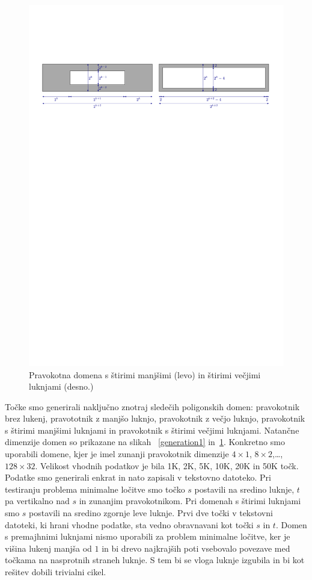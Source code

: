 \documentclass[a4paper, 12pt]{book}
\begin{document}
\begin{figure}
\centerline{\includegraphics[scale=0.75, page=2]{pics/data_generation.pdf}}
\caption{Pravokotna domena s štirimi manjšimi (levo) in štirimi večjimi luknjami (desno.)}
\label{generation2}
\end{figure}

Točke smo generirali naključno znotraj sledečih poligonskih domen: pravokotnik brez lukenj, pravototnik z manjšo luknjo, pravokotnik z večjo luknjo, pravokotnik s štirimi manjšimi luknjami in pravokotnik s štirimi večjimi luknjami. Natančne dimenzije domen so prikazane na slikah ~\ref{generation1} in~\ref{generation2}. Konkretno smo uporabili domene, kjer je imel zunanji pravokotnik dimenzije $4\times 1$, $8\times 2$,\ldots, $128\times 32$. Velikost vhodnih podatkov je bila 1K, 2K, 5K, 10K, 20K in 50K točk. Podatke smo generirali enkrat in nato zapisali v tekstovno datoteko. Pri testiranju problema minimalne ločitve smo točko $s$ postavili na sredino luknje, $t$ pa vertikalno nad $s$ in zunanjim pravokotnikom. Pri domenah s štirimi luknjami smo $s$ postavili na sredino zgornje leve luknje. Prvi dve točki v tekstovni datoteki, ki hrani vhodne podatke, sta vedno obravnavani kot točki $s$ in $t$. Domen s premajhnimi luknjami nismo uporabili za problem minimalne ločitve, ker je višina lukenj manjša od $1$ in bi drevo najkrajših poti vsebovalo povezave med točkama na nasprotnih straneh luknje. S tem bi se vloga luknje izgubila in bi kot rešitev dobili trivialni cikel. 
\end{document}
